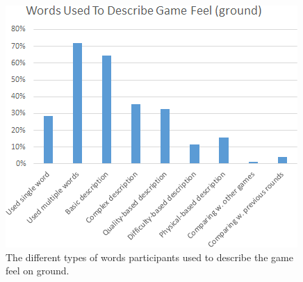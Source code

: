 \begin{figure}[htbp]
\centering
\includegraphics[width=0.8\columnwidth]{Pics/coding1}
\caption{The different types of words participants used to describe the game feel on ground.}
\label{fig:coding1}
\end{figure}




